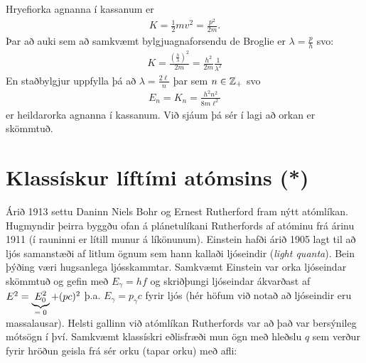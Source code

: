 Hryefiorka agnanna í kassanum er
\begin{align*}
    K = \frac{1}{2}mv^2 = \frac{p^2}{2m}.
\end{align*}
Þar að auki sem að samkvæmt bylgjuagnaforsendu de Broglie er $\lambda = \frac{p}{h}$ svo:
\begin{align*}
    K = \frac{\left( \frac{h}{\lambda} \right)^2}{2m} = \frac{h^2}{2m} \frac{1}{\lambda^2}
\end{align*}
En staðbylgjur uppfylla þá að $\lambda = \frac{2\ell}{n}$ þar sem $n \in \mathbb{Z}_+$ svo 
\begin{align*}
    E_n = K_n = \frac{h^2 n^2}{8m\ell^2}
\end{align*}
er heildarorka agnanna í kassanum. Við sjáum þá sér í lagi að orkan er skömmtuð. 

\section{Klassískur líftími atómsins (*)}

Árið 1913 settu Daninn Niels Bohr og Ernest Rutherford fram nýtt atómlíkan.
Hugmyndir þeirra byggðu ofan á plánetulíkani Rutherfords af atóminu frá árinu 1911 (í rauninni er lítill munur á líkönunum).
Einstein hafði árið 1905 lagt til að ljós samanstæði af litlum ögnum sem hann kallaði ljóseindir (\emph{light quanta}). Bein þýðing væri hugsanlega ljósskammtar.
Samkvæmt Einstein var orka ljóseindar skömmtuð og gefin með $E_\gamma = hf$ og skriðþungi ljóseindar ákvarðast af $E^2 = \underbrace{E_0^2}_\textrm{$=0$} + (pc)^2$ þ.a. $E_\gamma = p_\gamma c$ fyrir ljós (hér höfum við notað að ljóseindir eru massalausar).
Helsti gallinn við atómlíkan Rutherfords var að það var bersýnileg mótsögn í því. Samkvæmt klassískri eðlisfræði mun ögn með hleðslu $q$ sem verður fyrir hröðun geisla frá sér orku (tapar orku) með afli:

